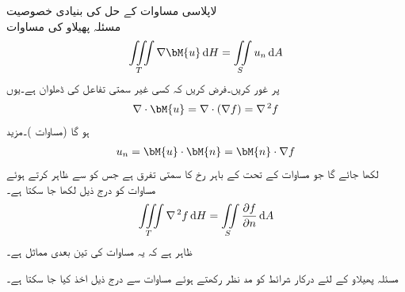 \quad لاپلاسی مساوات کے حل کی بنیادی خصوصیت\\
مسئلہ پھیلاو کی مساوات
\begin{align}\label{مساوات_خطی_تکمل_مسئلہ_پھیلاو_دوبارہ_الف}
\iiint\limits_T \nabla \bM{u}\dif H=\iint\limits_S u_n \dif A
\end{align}
پر غور کریں۔فرض کریں کہ  کسی غیر سمتی تفاعل کی ڈھلوان  ہے۔یوں
\begin{align*}
\nabla \cdot \bM{u}=\nabla \cdot (\nabla f)=\nabla^{\,2}f
\end{align*}
ہو گا (مساوات )۔مزید 
\begin{align*}
u_n=\bM{u}\cdot \bM{n}=\bM{n}\cdot \nabla f
\end{align*}
لکھا جائے گا جو مساوات  کے تحت  کے باہر رخ  کا سمتی تفرق ہے جس کو  سے ظاہر کرتے ہوئے  مساوات  کو درج ذیل لکھا جا سکتا ہے۔
\begin{align}\label{مساوات_خطی_تکمل_مسئلہ_پھیلاو_دوبارہ_ب}
\iiint\limits_T \nabla^{\,2}f\dif H=\iint\limits_S \frac{\partial f}{\partial n}\dif A
\end{align}
ظاہر ہے کہ یہ مساوات  کی تین بعدی مماثل ہے۔

مسئلہ پھیلاو کے لئے درکار شرائط کو مد نظر رکھتے ہوئے  مساوات  سے درج ذیل اخذ کیا جا سکتا ہے۔ 

